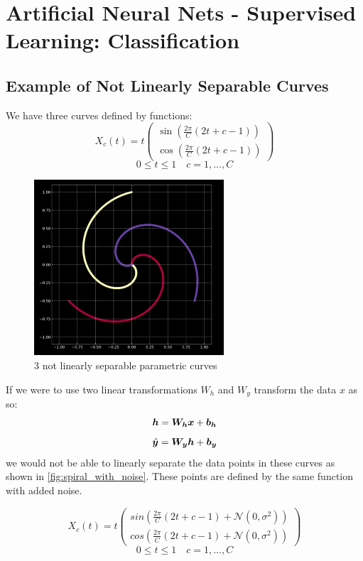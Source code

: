 \chapter{Artificial Neural Nets - Supervised Learning: Classification }

\section{Example of Not Linearly Separable Curves}

We have three curves defined by functions:
\[X_c(t) = t
\begin{pmatrix}
    \sin( \frac{2 \pi}{C}(2t + c -1)) \\
    \cos( \frac{2 \pi}{C}(2t + c -1))
\end{pmatrix}
 \]
\[ 0 \leq t \leq 1 \quad c = 1,..., C\]

\begin{figure}[ht]
    \centering
    \includegraphics[width=200pt]{labs/02/images/spiral1.png}
    \caption{3 not linearly separable parametric curves}
    \label{fig:spiral}
\end{figure}
 
\newpage

If we were to use two linear transformations $ W_h$ and $ W_y$  transform the data $x$ as so:
\[\matr{h}= \matr{W_h}\matr{x}+ \vect{b_h} \]
\[\hat{\vect{y}} = \matr{W_y} \matr{h} + \vect{b_y}\]
we would not be able to  linearly separate the data points in these curves as shown in \cref{fig:spiral_with_noise}.
These points are defined by the same function with added noise.

\[X_c(t) = t
\begin{pmatrix}
    sin( \frac{2 \pi}{C}(2t + c -1) + \mathcal{N} (0, \sigma ^2 )) \\
    cos( \frac{2 \pi}{C}(2t + c -1) + \mathcal{N} (0, \sigma ^2 ) )
\end{pmatrix}
 \]
\[ 0 \leq t \leq 1 \quad c = 1,..., C\]

